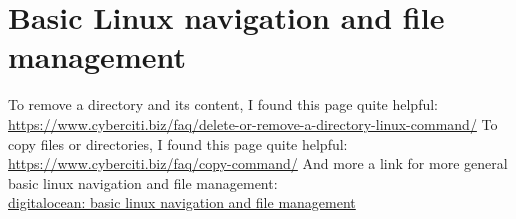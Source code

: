 \documentclass[11pt,a4paper]{article} %
\begin{document}
\section{Basic Linux navigation and file management}
To remove a directory and its content, I found this page quite helpful:\\
\url{https://www.cyberciti.biz/faq/delete-or-remove-a-directory-linux-command/}
To copy files or directories, I found this page quite helpful:\\
\url{https://www.cyberciti.biz/faq/copy-command/}
And more a link for more general basic linux navigation and file management:\\
\href{https://www.digitalocean.com/community/tutorials/basic-linux-navigation-and-file-management}{digitalocean: basic linux navigation and file management}\\
\end{document}
